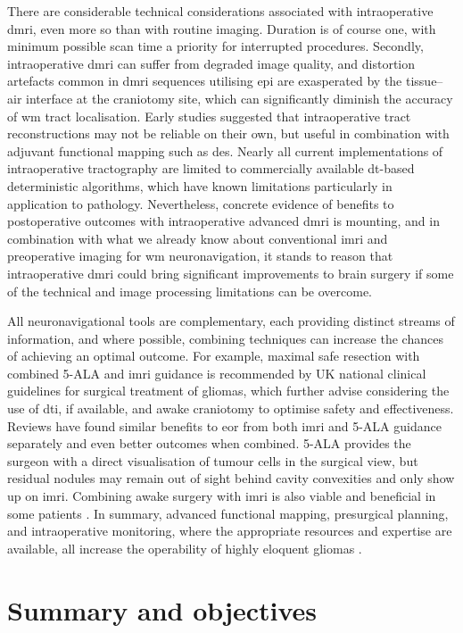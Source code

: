 \documentclass[12pt,phd,a4paper,twoside]{ucl_thesis}
\begin{document}
There are considerable technical considerations associated with intraoperative \gls{dmri}, even more so than with routine imaging.
Duration is of course one, with minimum possible scan time a priority for interrupted procedures.
Secondly, intraoperative \gls{dmri} can suffer from degraded image quality\autocite{Roder2019}, and distortion artefacts common in \gls{dmri} sequences utilising \gls{epi} are exasperated by the tissue--air interface at the craniotomy site\autocite{Elliott2020}, which can significantly diminish the accuracy of \gls{wm} tract localisation\autocite{Yang2022}.
Early studies suggested that intraoperative tract reconstructions may not be reliable on their own, but useful in combination with adjuvant functional mapping such as \gls{des}\autocite{Ostry2013}.
Nearly all current implementations of intraoperative tractography are limited to commercially available \gls{dt}-based deterministic algorithms, which have known limitations particularly in application to pathology.
Nevertheless, concrete evidence of benefits to postoperative outcomes with intraoperative advanced \gls{dmri} is mounting\autocite{DAndrea2012,Cui2015,Maesawa2010}, and in combination with what we already know about conventional \gls{imri} and preoperative imaging for \gls{wm} neuronavigation, it stands to reason that intraoperative \gls{dmri} could bring significant improvements to brain surgery if some of the technical and image processing limitations can be overcome.

All neuronavigational tools are complementary, each providing distinct streams of information, and where possible, combining techniques can increase the chances of achieving an optimal outcome.
For example, maximal safe resection with combined 5-ALA and \gls{imri} guidance is recommended by UK national clinical guidelines for surgical treatment of gliomas, which further advise considering the use of \gls{dti}, if available, and awake craniotomy to optimise safety and effectiveness\autocite{NICE2021}.
Reviews have found similar benefits to \gls{eor} from both \gls{imri} and 5-ALA guidance separately\autocite{Golub2020} and even better outcomes when combined\autocite{Nickel2018,Coburger2019}.
5-ALA provides the surgeon with a direct visualisation of tumour cells in the surgical view, but residual nodules may remain out of sight behind cavity convexities and only show up on \gls{imri}\autocite{SueroMolina2019}.
Combining awake surgery with \gls{imri} is also viable and beneficial in some patients \autocite{Motomura2017,Tuleasca2021}.
In summary, advanced functional mapping, presurgical planning, and intraoperative monitoring, where the appropriate resources and expertise are available\autocite{GeorgeZakiGhali2020}, all increase the operability of highly eloquent gliomas
\autocite{Bello2008,Krieg2013,DellaPuppa2013b,Magill2018}.
\clearpage{}
\clearpage{}\chapter{Summary and objectives}
\label{chap:problem}
\end{document}

